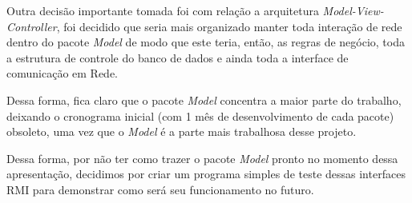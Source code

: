 \documentclass[brazil, a4paper,12pt]{article}
\begin{document}
Outra decisão importante tomada foi com relação a arquitetura \emph{Model-View-Controller}, foi decidido que seria mais organizado manter toda interação de rede dentro do pacote \emph{Model} de modo que este teria, então, as regras de negócio, toda a estrutura de controle do banco de dados e ainda toda a interface de comunicação em Rede. 

Dessa forma, fica claro que o pacote \emph{Model} concentra a maior parte do trabalho, deixando o cronograma inicial (com 1 mês de desenvolvimento de cada pacote) obsoleto, uma vez que o \emph{Model} é a parte mais trabalhosa desse projeto.

Dessa forma, por não ter como trazer o pacote \emph{Model} pronto no momento dessa apresentação, decidimos por criar um programa simples de teste dessas interfaces RMI para demonstrar como será seu funcionamento no futuro.
\end{document}
